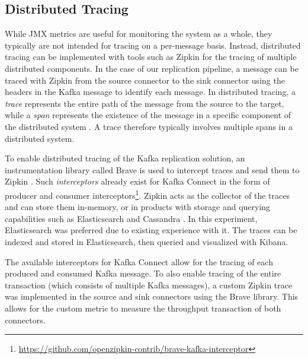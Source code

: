 
\subsection{Distributed Tracing}
While \ac{JMX} metrics are useful for monitoring the system as a whole, they typically are not intended for tracing on a per-message basis. Instead, distributed tracing can be implemented with tools such as Zipkin for the tracing of multiple distributed components. In the case of our replication pipeline, a message can be traced with Zipkin from the source connector to the sink connector using the headers in the Kafka message to identify each message. In distributed tracing, a \textit{trace} represents the entire path of the message from the source to the target, while a \textit{span} represents the existence of the message in a specific component of the distributed system \cite{janes2022zipkin}. A trace therefore typically involves multiple spans in a distributed system.

To enable distributed tracing of the Kafka replication solution, an instrumentation library called Brave is used to intercept traces and send them to Zipkin \cite{mallanna2020distributedzipkin}. Such \textit{interceptors} already exist for Kafka Connect in the form of producer and consumer interceptors\footnote{\url{https://github.com/openzipkin-contrib/brave-kafka-interceptor}}. 
Zipkin acts as the collector of the traces and can store them in-memory, or in products with storage and querying capabilities such as Elasticsearch and Cassandra \cite{mallanna2020distributedzipkin}. In this experiment, Elasticsearch was preferred due to existing experience with it. The traces can be indexed and stored in Elasticsearch, then queried and visualized with Kibana. %

The available interceptors for Kafka Connect allow for the tracing of each produced and consumed Kafka message. To also enable tracing of the entire transaction (which consists of multiple Kafka messages), a custom Zipkin trace was implemented in the source and sink connectors using the Brave library. This allows for the custom metric to measure the throughput transaction of both connectors.





